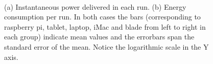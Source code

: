 \begin{figure}[!t]
~~
\caption{(a) Instantaneous power delivered in each run. (b) Energy consumption per run. In both cases the bars (corresponding to raspberry pi, tablet, laptop, iMac and blade from left to right in each group) indicate mean values and the errorbars span the standard error of the mean. Notice the logarithmic scale in the Y axis.\label{fig:powerenergy}}
\end{figure}









